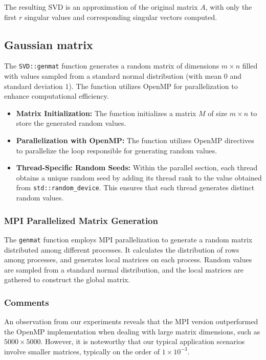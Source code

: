 \documentclass{article}
\begin{document}
   The resulting SVD is an approximation of the original matrix $A$, with only the first $r$ singular values and corresponding singular vectors computed.

\subsection{Gaussian matrix}
The \texttt{SVD::genmat} function generates a random matrix of dimensions $m \times n$ filled with values sampled from a standard normal distribution (with mean $0$ and standard deviation $1$). The function utilizes OpenMP for parallelization to enhance computational efficiency.

\begin{itemize}
    \item \textbf{Matrix Initialization:} The function initializes a matrix $M$ of size $m \times n$ to store the generated random values.
    
    \item \textbf{Parallelization with OpenMP:} The function utilizes OpenMP directives to parallelize the loop responsible for generating random values.
    
    \item \textbf{Thread-Specific Random Seeds:} Within the parallel section, each thread obtains a unique random seed by adding its thread rank to the value obtained from \texttt{std::random\_device}. This ensures that each thread generates distinct random values.
\end{itemize}

\subsubsection*{MPI Parallelized Matrix Generation}

The \texttt{genmat} function employs MPI parallelization to generate a random matrix distributed among different processes. It calculates the distribution of rows among processes, and generates local matrices on each process. Random values are sampled from a standard normal distribution, and the local matrices are gathered to construct the global matrix.


\subsubsection*{Comments}

An observation from our experiments reveals that the MPI version outperformed the OpenMP implementation when dealing with large matrix dimensions, such as $5000 \times 5000$. However, it is noteworthy that our typical application scenarios involve smaller matrices, typically on the order of $1 \times 10^{-3}$.
\end{document}
